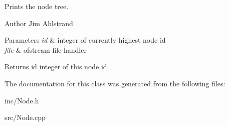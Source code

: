Prints the node tree. 

\begin{DoxyAuthor}{Author}
Jim Ahlstrand 
\end{DoxyAuthor}

\begin{DoxyParams}{Parameters}
{\em id} & integer of currently highest node id \\
\hline
{\em file} & ofstream file handler \\
\hline
\end{DoxyParams}
\begin{DoxyReturn}{Returns}
id integer of this node id 
\end{DoxyReturn}


The documentation for this class was generated from the following files\+:\begin{DoxyCompactItemize}
\item 
inc/Node.\+h\item 
src/Node.\+cpp\end{DoxyCompactItemize}
